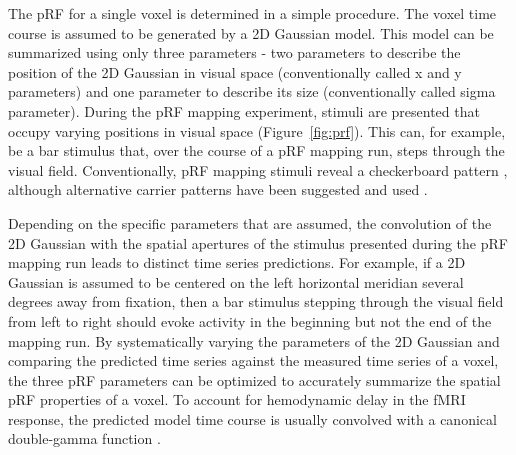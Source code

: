 The pRF for a single voxel is determined in a simple procedure. The voxel time course is assumed to be generated by a 2D Gaussian model. This model can be summarized using only three parameters - two parameters to describe the position of the 2D Gaussian in visual space (conventionally called x and y parameters) and one parameter to describe its size (conventionally called sigma parameter). During the pRF mapping experiment, stimuli are presented that occupy varying positions in visual space (Figure~\ref{fig:prf}). This can, for example, be a bar stimulus that, over the course of a pRF mapping run, steps through the visual field. Conventionally, pRF mapping stimuli reveal a checkerboard pattern \parencite{Dumoulin2008}, although alternative carrier patterns have been suggested and used \parencite{Alvarez2015}.

Depending on the specific parameters that are assumed, the convolution of the 2D Gaussian with the spatial apertures of the stimulus presented during the pRF mapping run leads to distinct time series predictions. For example, if a 2D Gaussian is assumed to be centered on the left horizontal meridian several degrees away from fixation, then a bar stimulus stepping through the visual field from left to right should evoke activity in the beginning but not the end of the mapping run. By systematically varying the parameters of the 2D Gaussian and comparing the predicted time series against the measured time series of a voxel, the three pRF parameters can be optimized to accurately summarize the spatial pRF properties of a voxel. To account for hemodynamic delay in the fMRI response, the predicted model time course is usually convolved with a canonical double-gamma function \parencite{Friston1998}.

